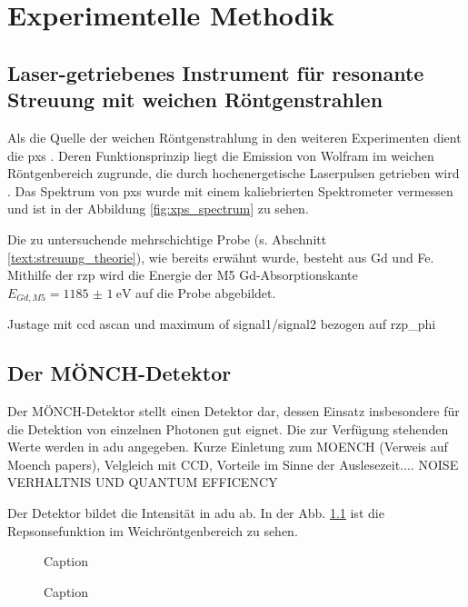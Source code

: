 \chapter{Experimentelle Methodik}

\section{Laser-getriebenes Instrument für resonante Streuung mit weichen Röntgenstrahlen}
Als die Quelle der weichen Röntgenstrahlung in den weiteren Experimenten dient die \gls{pxs} \cite{schick_laser-driven_2021}. Deren Funktionsprinzip liegt die Emission von Wolfram im weichen Röntgenbereich zugrunde, die durch hochenergetische Laserpulsen getrieben wird \cite{mantouvalou_high_2015}. Das Spektrum von \gls{pxs} wurde mit einem kaliebrierten Spektrometer vermessen und ist in der Abbildung \ref{fig:xps_spectrum} zu sehen.

Die zu untersuchende mehrschichtige Probe (s. Abschnitt \ref{text:streuung_theorie}), wie bereits erwähnt wurde, besteht aus Gd und Fe. Mithilfe der \gls{rzp} wird die Energie der M5 Gd-Absorptionskante $E_{Gd, M5} = \SI{1185(1)}{\eV}$ \cite[Abb. 6(a)]{prieto_x-ray_2005} auf die Probe abgebildet.

Justage mit ccd ascan und maximum of signal1/signal2 bezogen auf rzp\_phi 

\section{Der MÖNCH-Detektor}
\label{text:moench_theorie}
Der MÖNCH-Detektor stellt einen Detektor dar, dessen Einsatz insbesondere für die Detektion von einzelnen Photonen gut eignet. Die zur Verfügung stehenden Werte werden in \gls{adu} angegeben. \cite{bergamaschi_monch_2018}
Kurze Einletung zum MOENCH (Verweis auf Moench papers), Velgleich mit CCD, Vorteile 
im Sinne der Auslesezeit.... NOISE VERHALTNIS  UND QUANTUM EFFICENCY

Der Detektor bildet die Intensität in \gls{adu} ab. In der Abb. \ref{fig:response_moench} ist die Repsonsefunktion im Weichröntgenbereich zu sehen. 
\begin{figure}[H]
    \centering
    
    \caption{Caption}
    \label{fig:response_moench}
\end{figure}
\begin{figure}[H]
    \centering
    
    \caption{Caption}
    \label{fig:noise_moench}
\end{figure}

